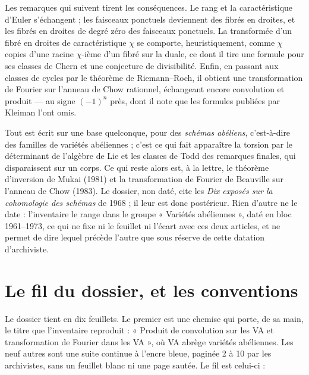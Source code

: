 \documentclass[11pt,a4paper]{article}
\begin{document}
\begin{resume}
Les remarques qui suivent tirent les conséquences. Le rang et la
caractéristique d'Euler s'échangent ; les faisceaux ponctuels deviennent des
fibrés en droites, et les fibrés en droites de degré zéro des faisceaux
ponctuels. La transformée d'un fibré en droites de caractéristique $\chi$ se
comporte, heuristiquement, comme $\chi$ copies d'une racine $\chi$-ième d'un
fibré sur la duale, ce dont il tire une formule pour ses classes de Chern et
une conjecture de divisibilité. Enfin, en passant aux classes de cycles par le
théorème de Riemann--Roch, il obtient une transformation de Fourier sur
l'anneau de Chow rationnel, échangeant encore convolution et produit — au
signe $(-1)^n$ près, dont il note que les formules publiées par Kleiman l'ont
omis.

Tout est écrit sur une base quelconque, pour des \emph{schémas abéliens},
c'est-à-dire des familles de variétés abéliennes ; c'est ce qui fait
apparaître la torsion par le déterminant de l'algèbre de Lie et les classes de
Todd des remarques finales, qui disparaissent sur un corps. Ce qui reste
alors est, à la lettre, le théorème d'inversion de Mukai (1981) et la
transformation de Fourier de Beauville sur l'anneau de Chow (1983). Le
dossier, non daté, cite les \emph{Dix exposés sur la cohomologie des schémas}
de 1968 ; il leur est donc postérieur. Rien d'autre ne le date : l'inventaire
le range dans le groupe « Variétés abéliennes », daté en bloc 1961--1973, ce qui
ne fixe ni le feuillet ni l'écart avec ces deux articles, et ne permet de dire
lequel précède l'autre que sous réserve de cette datation d'archiviste.

\end{resume}

\section*{Le fil du dossier, et les conventions}

Le dossier tient en dix feuillets. Le premier est une chemise qui porte, de
sa main, le titre que l'inventaire reproduit : « Produit de convolution sur
les VA et transformation de Fourier dans les VA », où VA abrège variétés
abéliennes. Les neuf autres sont une suite continue à l'encre bleue,
paginée 2 à 10 par les archivistes, sans un feuillet blanc ni une page
sautée. Le fil est celui-ci :
\end{document}
